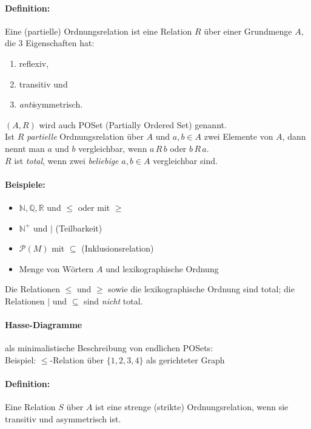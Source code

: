 \documentclass[10pt,a4paper]{article}
\begin{document}
\paragraph{Definition:}Eine (partielle) Ordnungsrelation ist eine Relation $R$ über einer Grundmenge $A$, die $3$ Eigenschaften hat:
\begin{enumerate}
\item reflexiv,
\item transitiv und
\item \emph{anti}symmetrisch.
\end{enumerate}
$(A,R)$ wird auch POSet (Partially Ordered Set) genannt.\\
Ist $R$ \emph{partielle} Ordnungsrelation über $A$ und $a,b \in A$ zwei Elemente von $A$, dann nennt man $a$ und $b$ vergleichbar, wenn $a\, R\, b$ oder $b\, R\, a$.\\
$R$ ist \emph{total}, wenn zwei \emph{beliebige} $a,b\in A$ vergleichbar sind.

\paragraph{Beispiele:}
\begin{itemize}
\item $\mathbb{N,Q,R}$ und $\leq$ oder mit $\geq$
\item $\mathbb{N}^+$ und $|$ (Teilbarkeit)
\item $\mathcal{P}(M)$ mit $\subseteq$ (Inklusionsrelation)
\item Menge von Wörtern $A$ und lexikographische Ordnung
\end{itemize}
Die Relationen $\leq$ und $\geq$ sowie die lexikographische Ordnung sind total; die Relationen $|$ und $\subseteq$ sind \emph{nicht} total.

\paragraph{Hasse-Diagramme}als minimalistische Beschreibung von endlichen POSets:\\
Beispiel: $\leq$-Relation über $\{1,2,3,4\}$ als gerichteter Graph

\paragraph{Definition:} Eine Relation $S$ über $A$ ist eine strenge (strikte) Ordnungsrelation, wenn sie transitiv und asymmetrisch ist.
\end{document}
